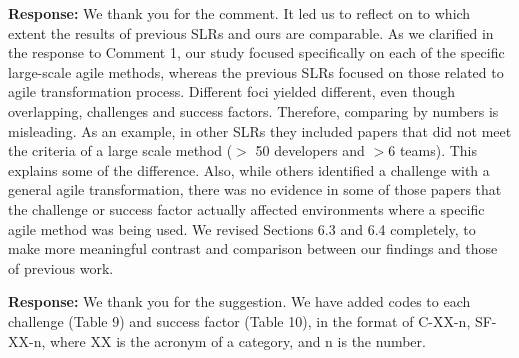 \documentclass[a4paper,twoside,11pt]{reviewresponse}
\begin{document}
\textbf{Response:}
We thank you for the comment. It led us to reflect on to which extent the results of previous SLRs and ours are comparable. As we clarified in the response to Comment 1, our study focused specifically on each of the  specific large-scale agile methods, whereas the previous SLRs focused on those related to agile transformation process. Different foci yielded different, even though overlapping, challenges and success factors. Therefore, comparing by numbers is misleading. As an example, in other SLRs they included papers that did not meet the criteria of a large scale method ($>$ 50 developers and $>$6 teams). This explains some of the difference. Also, while others identified a challenge with a general agile transformation, there was no evidence in some of those papers that the challenge or success factor actually affected environments where a specific agile method was being used. We revised Sections 6.3 and 6.4 completely, to make more meaningful contrast and comparison between our findings and those of previous work.


\textbf{Response:}
We thank you for the suggestion. We have added codes to each challenge (Table 9) and success factor (Table 10), in the format of C-XX-n, SF-XX-n, where XX is the acronym of a category, and n is the number.
\end{document}
